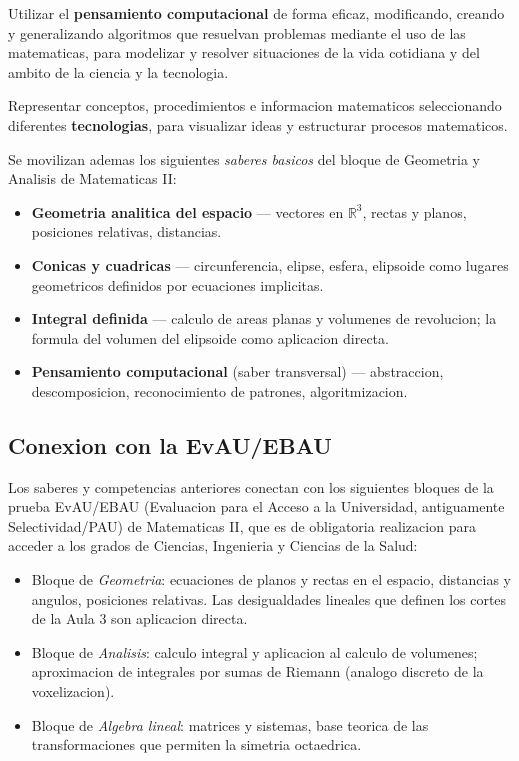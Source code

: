 \documentclass[12pt,a4paper]{scrartcl}
\newcommand{\acc}[1]{\textcolor{accent}{\textbf{#1}}}
\begin{document}
\begin{competencia}
Utilizar el \acc{pensamiento computacional} de forma eficaz, modificando, creando y generalizando algoritmos que resuelvan problemas mediante el uso de las matematicas, para modelizar y resolver situaciones de la vida cotidiana y del ambito de la ciencia y la tecnologia.
\end{competencia}

\begin{competencia}
Representar conceptos, procedimientos e informacion matematicos seleccionando diferentes \acc{tecnologias}, para visualizar ideas y estructurar procesos matematicos.
\end{competencia}

\medskip
Se movilizan ademas los siguientes \emph{saberes basicos} del bloque de Geometria y Analisis de Matematicas II:

\begin{itemize}[leftmargin=1.3em,itemsep=0.15em,topsep=0.3em]
  \item \acc{Geometria analitica del espacio} --- vectores en $\mathbb{R}^3$, rectas y planos, posiciones relativas, distancias.
  \item \acc{Conicas y cuadricas} --- circunferencia, elipse, esfera, elipsoide como lugares geometricos definidos por ecuaciones implicitas.
  \item \acc{Integral definida} --- calculo de areas planas y volumenes de revolucion; la formula del volumen del elipsoide como aplicacion directa.
  \item \acc{Pensamiento computacional} (saber transversal) --- abstraccion, descomposicion, reconocimiento de patrones, algoritmizacion.
\end{itemize}

\subsection{Conexion con la EvAU/EBAU}\label{sec:enem}

Los saberes y competencias anteriores conectan con los siguientes bloques de la prueba EvAU/EBAU (Evaluacion para el Acceso a la Universidad, antiguamente Selectividad/PAU) de Matematicas II, que es de obligatoria realizacion para acceder a los grados de Ciencias, Ingenieria y Ciencias de la Salud:

\begin{itemize}[leftmargin=1.3em,itemsep=0.15em,topsep=0.3em]
  \item Bloque de \emph{Geometria}: ecuaciones de planos y rectas en el espacio, distancias y angulos, posiciones relativas. Las desigualdades lineales que definen los cortes de la Aula 3 son aplicacion directa.
  \item Bloque de \emph{Analisis}: calculo integral y aplicacion al calculo de volumenes; aproximacion de integrales por sumas de Riemann (analogo discreto de la voxelizacion).
  \item Bloque de \emph{Algebra lineal}: matrices y sistemas, base teorica de las transformaciones que permiten la simetria octaedrica.
\end{itemize}
\end{document}
